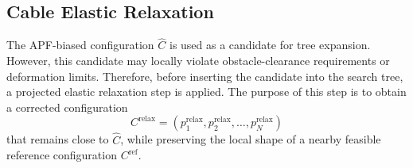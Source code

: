 \documentclass{pas}
\begin{document}


\subsection{Cable Elastic Relaxation}
\label{subsec:gcr_constrained_relaxation}

The APF-biased configuration \(\widehat{C}\) is used as a candidate for tree
expansion. However, this candidate may locally violate obstacle-clearance
requirements or deformation limits. Therefore, before inserting the candidate
into the search tree, a projected elastic relaxation step is applied. The
purpose of this step is to obtain a corrected configuration
\[
C^{\mathrm{relax}}
=
(p_1^{\mathrm{relax}},p_2^{\mathrm{relax}},\ldots,p_N^{\mathrm{relax}})
\]
that remains close to \(\widehat{C}\), while preserving the local shape of a nearby feasible reference configuration \(C^{\mathrm{ref}}\).
\end{document}
